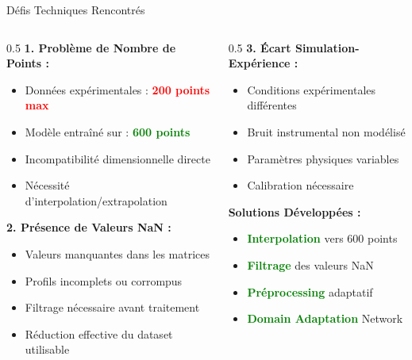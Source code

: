 \documentclass[aspectratio=169]{beamer}
\begin{document}
\begin{frame}{Défis Techniques Rencontrés}
    \begin{columns}
        \begin{column}{0.5\textwidth}
            \textbf{1. Problème de Nombre de Points :}
            \begin{itemize}
                \item Données expérimentales : \textcolor{red}{\textbf{200 points max}}
                \item Modèle entraîné sur : \textcolor{green}{\textbf{600 points}}
                \item Incompatibilité dimensionnelle directe
                \item Nécessité d'interpolation/extrapolation
            \end{itemize}

            \vspace{0.3cm}
            \textbf{2. Présence de Valeurs NaN :}
            \begin{itemize}
                \item Valeurs manquantes dans les matrices
                \item Profils incomplets ou corrompus
                \item Filtrage nécessaire avant traitement
                \item Réduction effective du dataset utilisable
            \end{itemize}
        \end{column}
        \begin{column}{0.5\textwidth}
            \textbf{3. Écart Simulation-Expérience :}
            \begin{itemize}
                \item Conditions expérimentales différentes
                \item Bruit instrumental non modélisé
                \item Paramètres physiques variables
                \item Calibration nécessaire
            \end{itemize}

            \vspace{0.3cm}
            \textbf{Solutions Développées :}
            \begin{itemize}
                \item \textcolor{green}{\textbf{Interpolation}} vers 600 points
                \item \textcolor{green}{\textbf{Filtrage}} des valeurs NaN
                \item \textcolor{green}{\textbf{Préprocessing}} adaptatif
                \item \textcolor{green}{\textbf{Domain Adaptation}} Network
            \end{itemize}
        \end{column}
    \end{columns}
\end{frame}
\end{document}
